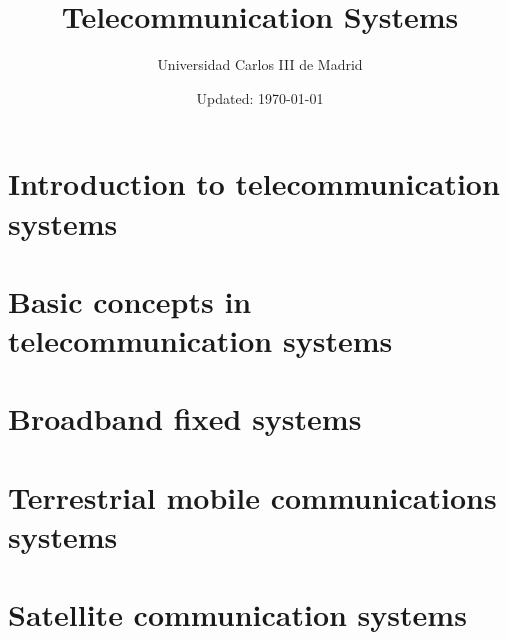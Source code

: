 \documentclass[
	12pt,
	twoside
]{book}
\title{Telecommunication Systems}
\author{Universidad Carlos III de Madrid}
\date{Updated: \today}
\begin{document}

\newpage

\tableofcontents

\chapter{Introduction to telecommunication systems}


\chapter{Basic concepts in telecommunication systems}


\chapter{Broadband fixed systems}


\chapter{Terrestrial mobile communications systems}


\chapter{Satellite communication systems}



\end{document}
